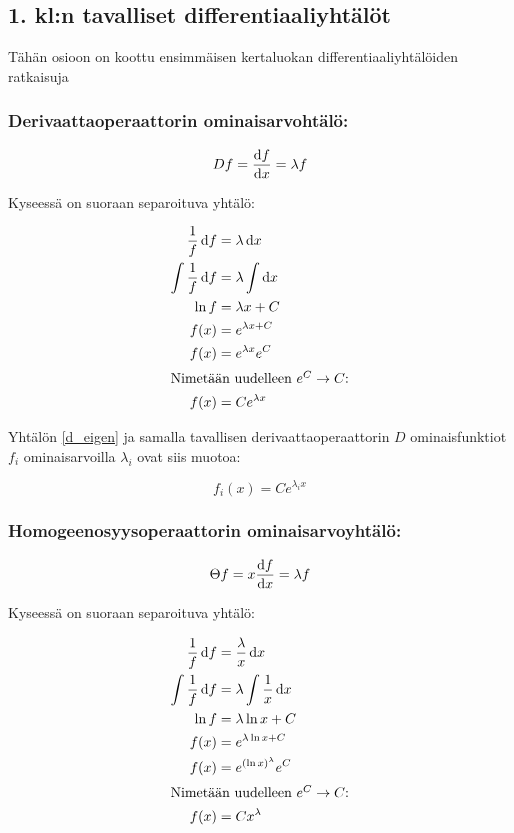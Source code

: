 \documentclass[../johdoksia.tex]{subfiles}
\begin{document}
	\subsection{1. kl:n tavalliset differentiaaliyhtälöt}
	
	Tähän osioon on koottu ensimmäisen kertaluokan differentiaaliyhtälöiden ratkaisuja
	
	\subsubsection{Derivaattaoperaattorin ominaisarvohtälö:}
	
	\begin{equation}
		\label{d_eigen}
		Df = \odv{f}{x} = \lambda f
	\end{equation}
	
	Kyseessä on suoraan separoituva yhtälö:
	
	\begin{align*}
		\frac{1}{f}\odif{f} &= \lambda\odif{x} \\
		\int\frac{1}{f}\odif{f} &= \lambda\int\odif{x} \\
		\ln f &= \lambda x + C \\
		f(x) &= e^{\lambda x + C} \\
		f(x) &= e^{\lambda x}e^{C} \\
		\intertext{Nimetään uudelleen $e^C \to C$:}
		f(x) &= Ce^{\lambda x} 
	\end{align*}
	
	Yhtälön \ref{d_eigen} ja samalla tavallisen derivaattaoperaattorin $D$ ominaisfunktiot $f_i$ ominaisarvoilla $\lambda_i$ ovat siis muotoa:
	
	\begin{equation}
		\boxed{f_i(x) = Ce^{\lambda_ix}}
	\end{equation}
	
	\subsubsection{Homogeenosyysoperaattorin ominaisarvoyhtälö:}
	
	\begin{equation}
		\label{theta_eigen}
		\Theta f = x\odv{f}{x} = \lambda f
	\end{equation}
	
	Kyseessä on suoraan separoituva yhtälö:
	
	\begin{align*}
		\frac{1}{f}\odif{f} &= \frac{\lambda}{x}\odif{x} \\
		\int\frac{1}{f}\odif{f} &= \lambda\int\frac{1}{x}\odif{x} \\
		\ln f &= \lambda\ln x + C \\
		f(x) &= e^{\lambda\ln x + C} \\
		f(x) &= e^{(\ln x)^\lambda}e^{C} \\
		\intertext{Nimetään uudelleen $e^C \to C$:}
		f(x) &= Cx^{\lambda}
	\end{align*}
	
\end{document}
